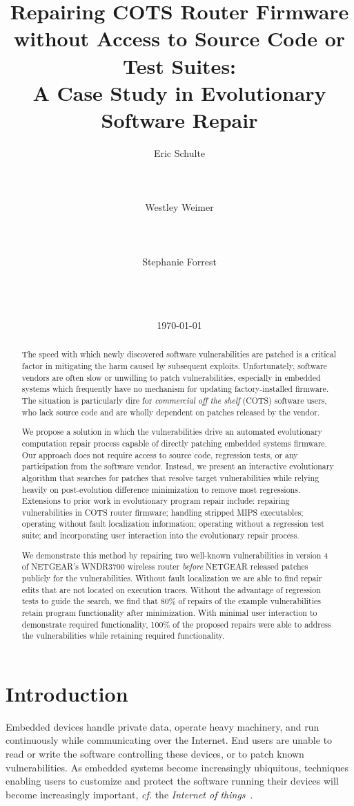 \documentclass{sig-alternate}
\date{\today}
\title{Repairing COTS Router Firmware without Access to Source Code or
Test Suites:\\ A Case Study in Evolutionary Software Repair}
\author{
\alignauthor
Eric Schulte\\
\affaddr{GrammaTech, Inc.}\\
\affaddr{531 Esty Street}\\
\affaddr{Ithaca, New York 14850}\\
\email{eschulte@grammatech.com}
\alignauthor
Westley Weimer\\
\affaddr{Dept. of Computer Science}\\
\affaddr{University of Virginia}\\
\affaddr{Charlottesville, VA 22904}\\
\email{weimer@cs.virginia.edu}
\alignauthor
Stephanie Forrest\\
\affaddr{Dept. of Computer Science}\\
\affaddr{University of New Mexico}\\
\affaddr{Albuquerque, NM 87131}\\
\email{forrest@cs.unm.edu}
}
\begin{document}
\maketitle

\begin{abstract}
The speed with which newly discovered software vulnerabilities are
patched is a critical factor in mitigating the harm caused by
subsequent exploits.  Unfortunately, software vendors are often slow
or unwilling to patch vulnerabilities, especially in embedded systems
which frequently have no mechanism for updating factory-installed
firmware.  The situation is particularly dire for {\em commercial off
  the shelf} (COTS) software users, who lack source code and are
wholly dependent on patches released by the vendor.

We propose a solution in which the vulnerabilities drive an automated
evolutionary computation repair process capable of directly patching
embedded systems firmware.  Our approach does not require access to
source code, regression tests, or any participation from the software
vendor.  Instead, we present an interactive evolutionary algorithm
that searches for patches that resolve target vulnerabilities while
relying heavily on post-evolution difference minimization to remove
most regressions.  Extensions to prior work in evolutionary program
repair include: repairing vulnerabilities in COTS router firmware;
handling stripped MIPS executables; operating without fault
localization information; operating without a regression test suite;
and incorporating user interaction into the evolutionary repair
process.

We demonstrate this method by repairing two well-known vulnerabilities
in version 4 of NETGEAR's WNDR3700 wireless router \emph{before}
NETGEAR released patches publicly for the vulnerabilities.  Without
fault localization we are able to find repair edits that are not
located on execution traces.  Without the advantage of regression
tests to guide the search, we find that 80\% of repairs of the example
vulnerabilities retain program functionality after minimization.  With
minimal user interaction to demonstrate required functionality, 100\%
of the proposed repairs were able to address the vulnerabilities while
retaining required functionality.

\end{abstract}

\vspace*{1ex}
\section{Introduction}
\label{sec-1}
Embedded devices handle private data, operate heavy machinery, and run
continuously while communicating over the Internet.  End users are
unable to read or write the software controlling these devices, or to
patch known vulnerabilities.  As embedded systems become increasingly
ubiquitous, techniques enabling users to customize and protect the
software running their devices will become increasingly important,
{\em cf.} the {\em Internet of things}~\cite{atzori2010internet}.
\end{document}
